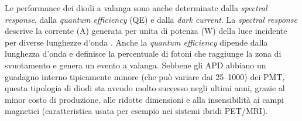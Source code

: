 Le performance dei diodi a valanga sono anche determinate dalla \textit{spectral response}, dalla \textit{quantum efficiency} (QE) e dalla \textit{dark current}. La \textit{spectral response} descrive la corrente (A) generata per unita di potenza (W) della luce incidente per diverse lunghezze d'onda \cite{Jiang2019}. Anche la \textit{quantum efficiency} dipende dalla lunghezza d'onda e definisce la percentuale di fotoni che raggiunge la zona di svuotamento e genera un evento a valanga. Sebbene gli APD abbiano un guadagno interno tipicamente minore (che può variare dai \numrange[range-phrase=--]{25}{1000}) dei PMT, questa tipologia di diodi sta avendo molto successo negli ultimi anni, grazie al minor costo di produzione, alle ridotte dimensioni e alla insensibilità ai campi magnetici (caratteristica usata per esempio nei sistemi ibridi PET/MRI).

\clearpage
